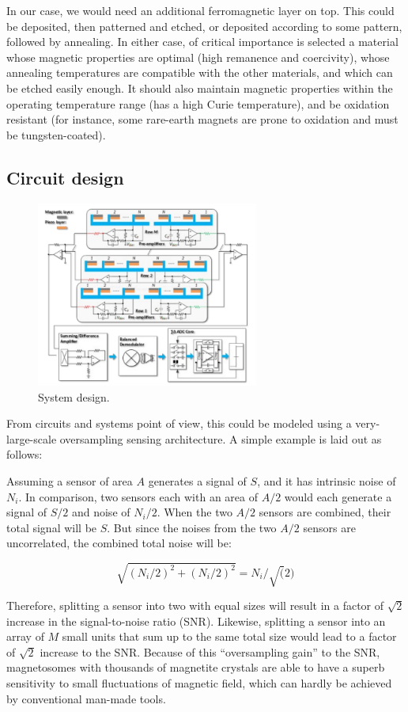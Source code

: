 In our case, we would need an additional ferromagnetic layer on top. This could be deposited, then patterned and etched, or deposited according to some pattern, followed by annealing. In either case, of critical importance is selected a material whose magnetic properties are optimal (high remanence and coercivity), whose annealing temperatures are compatible with the other materials, and which can be etched easily enough. It should also maintain magnetic properties within the operating temperature range (has a high Curie temperature), and be oxidation resistant (for instance, some rare-earth magnets are prone to oxidation and must be tungsten-coated).

\subsection{Circuit design}
 
\begin{figure}
\centering
\includegraphics[width=0.65\textwidth]{system}
\caption{System design.}
\label{fig:system}
\end{figure}

From circuits and systems point of view, this could be modeled using a very-large-scale oversampling sensing architecture. A simple example is laid out as follows: 

Assuming a sensor of area $A$ generates a signal of $S$, and it has intrinsic noise of $N_i$. In comparison, two sensors each with an area of $A/2$ would each generate a signal of $S/2$ and noise of $N_i/2$. When the two $A/2$ sensors are combined, their total signal will be $S$. But since the noises from the two $A/2$ sensors are uncorrelated, the combined total noise will be:

$$\sqrt{(N_i/2)^2+(N_i/2)^2} = N_i/\sqrt(2) $$

Therefore, splitting a sensor into two with equal sizes will result in a factor of $\sqrt{2}$ increase in the signal-to-noise ratio (SNR). Likewise, splitting a sensor into an array of $M$ small units that sum up to the same total size would lead to a factor of $\sqrt{2}$ increase to the SNR. Because of this “oversampling gain” to the SNR, magnetosomes with thousands of magnetite crystals are able to have a superb sensitivity to small fluctuations of magnetic field, which can hardly be achieved by conventional man-made tools. 

